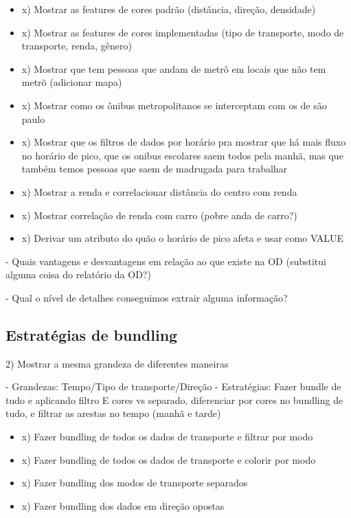   \begin{itemize}
    \item x) Mostrar as features de cores padrão (distância, direção, densidade)
    \item x) Mostrar as features de cores implementadas (tipo de transporte, modo de transporte, renda, gênero)
    \item x) Mostrar que tem pessoas que andam de metrô em locais que não tem metrõ (adicionar mapa)
    \item x) Mostrar como os ônibus metropolitanos se interceptam com os de são paulo
    \item x) Mostrar que os filtros de dados por horário pra mostrar que há mais fluxo
       no horário de pico, que os onibus escolares saem todos pela manhã, mas que também temos
      pessoas que saem de madrugada para trabalhar
    \item x) Mostrar a renda e correlacionar distância do centro com renda
    \item x) Mostrar correlação de renda com carro (pobre anda de carro?)
    \item x) Derivar um atributo do quão o horário de pico afeta e usar como VALUE
  \end{itemize}

	- Quais vantagens e desvantagens em relação ao que existe na OD (substitui alguma coisa do relatório da OD?)

	- Qual o nível de detalhes conseguimos extrair alguma informação?

  
\subsection{Estratégias de bundling}

2) Mostrar a mesma grandeza de diferentes maneiras

- Grandezas: Tempo/Tipo de transporte/Direção
- Estratégias: Fazer bundle de tudo e aplicando filtro E cores vs separado,
diferenciar por cores no bundling de tudo, e filtrar as arestas no tempo (manhã
e tarde)

  \begin{itemize}
    \item x) Fazer bundling de todos os dados de transporte e filtrar por modo
    \item x) Fazer bundling de todos os dados de transporte e colorir por modo
    \item x) Fazer bundling dos modos de transporte separados
    \item x) Fazer bundling dos dados em direção opostas
  \end{itemize}

